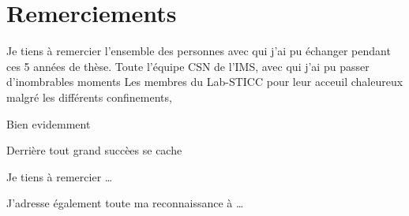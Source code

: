\documentclass[../main.tex]{subfiles}
\begin{document}
\chapter*{Remerciements}


Je tiens à remercier l'ensemble des personnes avec qui j'ai pu échanger pendant ces 5 années de thèse. 
Toute l'équipe CSN de l'IMS, avec qui j'ai pu passer d'inombrables moments 
Les membres du Lab-STICC pour leur acceuil chaleureux malgré les différents confinements, 

Bien evidemment 


Derrière tout grand succèes se cache 

Je tiens à remercier \dots

J'adresse également toute ma reconnaissance à \dots
\end{document}
